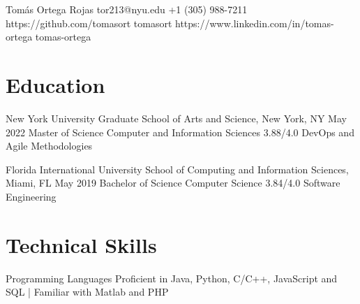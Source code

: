 \documentclass[letterpaper,10pt]{article}
\begin{document}
\head
  {}
  {Tomás Ortega Rojas}
  {tor213@nyu.edu}  %
  {+1 (305) 988-7211}
  {https://github.com/tomasort}
  {tomasort}
  {https://www.linkedin.com/in/tomas-ortega}
  {tomas-ortega}


\section{Education}
\sectionStart
  \educationItem
    {New York University}
    {Graduate School of Arts and Science, New York, NY} 
    {May 2022}
    {Master of Science} 
    {Computer and Information Sciences} 
    {3.88/4.0}
    {
      DevOps and Agile Methodologies
      }

  \educationItem
    {Florida International University}
    {School of Computing and Information Sciences, Miami, FL} 
    {May 2019}
    {Bachelor of Science} 
    {Computer Science} 
    {3.84/4.0}
    {
      Software Engineering
    }
\sectionEnd

\section{Technical Skills}
\sectionStart

  \skillItem
    {Programming Languages}
    {Proficient in Java, Python, C/C++, JavaScript and SQL |
      Familiar with Matlab and PHP}
\end{document}
